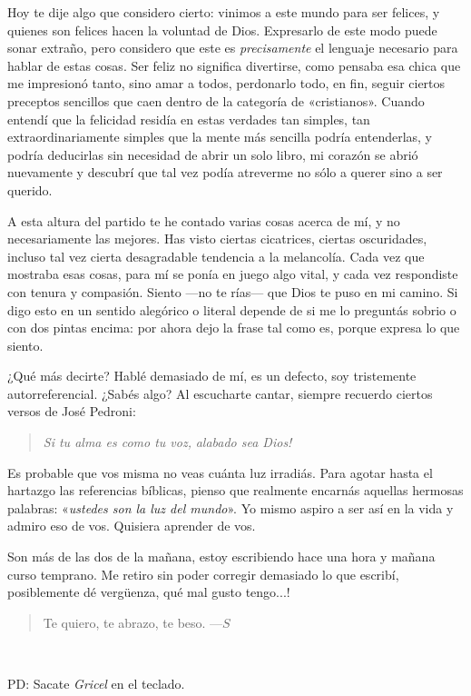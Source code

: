 \documentclass[a4paper]{article}
\begin{document}
Hoy te dije algo que considero cierto: vinimos a este mundo para ser felices, y
quienes son felices hacen la voluntad de Dios. Expresarlo de este modo puede
sonar extraño, pero considero que este es \textit{precisamente} el lenguaje
necesario para hablar de estas cosas. Ser feliz no significa divertirse, como
pensaba esa chica que me impresionó tanto, sino amar a todos, perdonarlo todo,
en fin, seguir ciertos preceptos sencillos que caen dentro de la categoría de
«cristianos». Cuando entendí que la felicidad residía en estas verdades tan
simples, tan extraordinariamente simples que la mente más sencilla podría
entenderlas, y podría deducirlas sin necesidad de abrir un solo libro, mi
corazón se abrió nuevamente y descubrí que tal vez podía atreverme no sólo a
querer sino a ser querido. 

A esta altura del partido te he contado varias cosas acerca de mí, y no
necesariamente las mejores. Has visto ciertas cicatrices, ciertas oscuridades,
incluso tal vez cierta desagradable tendencia a la melancolía. Cada vez que
mostraba esas cosas, para mí se ponía en juego algo vital, y cada vez
respondiste con tenura y compasión. Siento ---no te rías--- que Dios te puso en
mi camino. Si digo esto en un sentido alegórico o literal depende de si me lo
preguntás sobrio o con dos pintas encima: por ahora dejo la frase tal como es,
porque expresa lo que siento.

¿Qué más decirte? Hablé demasiado de mí, es un defecto, soy tristemente
autorreferencial. ¿Sabés algo? Al escucharte cantar, siempre recuerdo ciertos
versos de José Pedroni:

\begin{quote}
    \textit{Si tu alma es como tu voz,}\newline
    \textit{alabado sea Dios!}
\end{quote}

Es probable que vos misma no veas cuánta luz irradiás. Para agotar hasta el
hartazgo las referencias bíblicas, pienso que realmente encarnás aquellas
hermosas palabras: «\textit{ustedes son la luz del mundo}». Yo mismo aspiro a
ser así en la vida y admiro eso de vos. Quisiera aprender de vos.

Son más de las dos de la mañana, estoy escribiendo hace una hora y mañana curso
temprano. Me retiro sin poder corregir demasiado lo que escribí, posiblemente dé
vergüenza, qué mal gusto tengo...! 

\begin{quote}
Te quiero, te abrazo, te beso. \newline
---$S$
\end{quote}

~ 

PD: Sacate \textit{Gricel} en el teclado.
\end{document}

